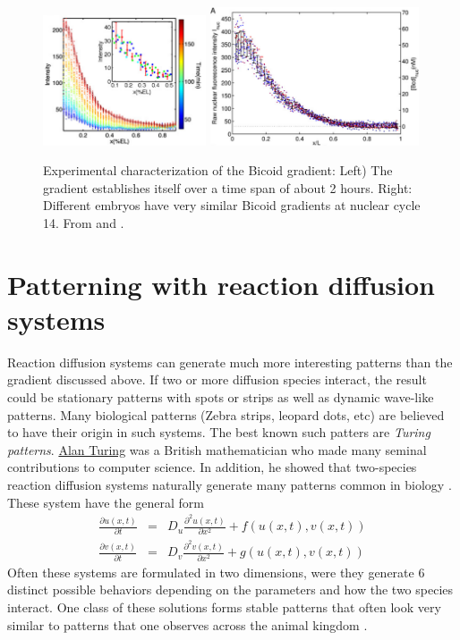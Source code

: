 \begin{figure}[tb]
	\centering
	\includegraphics[width=0.43\textwidth]{figures/Gregor_Bcd_gradient_buildup.png}
	\includegraphics[width=0.55\textwidth]{figures/Gregor_Bcd_gradient_reproducibility.png}
	\caption{Experimental characterization of the Bicoid gradient: Left) The gradient establishes itself over a time span of about 2 hours. Right: Different embryos have very similar Bicoid gradients at nuclear cycle 14. From \citep{gregor_stability_2007} and \citep{gregor_probing_2007}.}
	\label{fig:bicoid_gradient}
\end{figure}


\section{Patterning with reaction diffusion systems}
Reaction diffusion systems can generate much more interesting patterns than the gradient discussed above.
If two or more diffusion species interact, the result could be stationary patterns with spots or strips as well as dynamic wave-like patterns.
Many biological patterns (Zebra strips, leopard dots, etc) are believed to have their origin in such systems.
The best known such patters are {\it Turing patterns}.
\href{https://en.wikipedia.org/wiki/Alan_Turing}{Alan Turing} was a British mathematician who made many seminal contributions to computer science.
In addition, he showed that two-species reaction diffusion systems naturally generate many patterns common in biology \citep{turing_chemical_1952}.
These system have the general form
\begin{eqnarray}
	\frac{\partial u(x,t)}{\partial t} &=& D_u \frac{\partial^2 u(x,t)}{\partial x^2} + f(u(x,t),v(x,t)) \\
	\frac{\partial v(x,t)}{\partial t} &=& D_v \frac{\partial^2 v(x,t)}{\partial x^2} + g(u(x,t),v(x,t))
\end{eqnarray}
Often these systems are formulated in two dimensions, were they generate 6 distinct possible behaviors depending on the parameters and how the two species interact.
One class of these solutions forms stable patterns that often look very similar to patterns that one observes across the animal kingdom \citep{kondo_reaction-diffusion_2010}.

